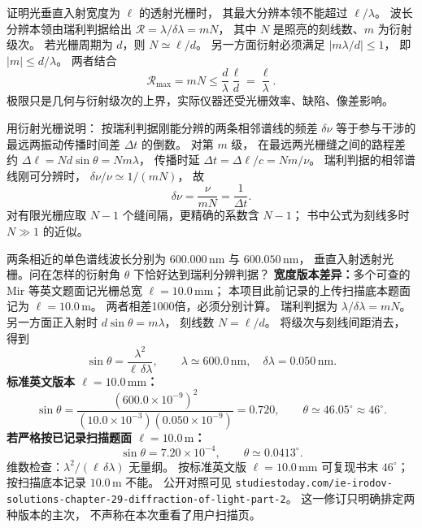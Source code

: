 证明光垂直入射宽度为 $\ell$ 的透射光栅时，
其最大分辨本领不能超过 $\ell/\lambda$。
\exsolution
波长分辨本领由瑞利判据给出
$\mathcal R=\lambda/\delta\lambda=mN$，
其中 $N$ 是照亮的刻线数、$m$ 为衍射级次。
若光栅周期为 $d$，则 $N\simeq\ell/d$。
另一方面衍射必须满足
$|m\lambda/d|\le1$，
即 $|m|\le d/\lambda$。
两者结合
\[
\boxed{\mathcal R_{\max}=mN
\le\frac d\lambda\frac\ell d
=\frac\ell\lambda}.
\]
\excheck 极限只是几何与衍射级次的上界，实际仪器还受光栅效率、缺陷、像差影响。

用衍射光栅说明：
按瑞利判据刚能分辨的两条相邻谱线的频差
$\delta\nu$ 等于参与干涉的最远两振动传播时间差 $\Delta t$ 的倒数。
\exsolution
对第 $m$ 级，
在最远两光栅缝之间的路程差约
$\Delta\ell=N d\sin\theta
=N m\lambda$，
传播时延
$\Delta t=\Delta\ell/c
=Nm/\nu$。
瑞利判据的相邻谱线刚可分辨时，
$\delta\nu/\nu\simeq1/(mN)$，
故
\[
\boxed{\delta\nu=
\frac{\nu}{mN}
=\frac1{\Delta t}}.
\]
\excheck 对有限光栅应取 $N-1$ 个缝间隔，更精确的系数含 $N-1$；
书中公式为刻线多时 $N\gg1$ 的近似。

两条相近的单色谱线波长分别为
$600.000\,\mathrm{nm}$ 与 $600.050\,\mathrm{nm}$，
垂直入射透射光栅。问在怎样的衍射角
$\theta$ 下恰好达到瑞利分辨判据？
\textbf{宽度版本差异：}多个可查的 Mir 等英文题面记光栅总宽
$\ell=10.0\,\mathrm{mm}$；
本项目此前记录的上传扫描底本题面记为
$\ell=10.0\,\mathrm m$。
两者相差1000倍，必须分别计算。
\exsolution
瑞利判据为 $\lambda/\delta\lambda=mN$。
另一方面正入射时 $d\sin\theta=m\lambda$，
刻线数 $N=\ell/d$。
将级次与刻线间距消去，得到
\[
 \boxed{\sin\theta
 =\frac{\lambda^2}{\ell\,\delta\lambda}},
 \qquad
 \lambda\simeq600.0\,\mathrm{nm},\quad
 \delta\lambda=0.050\,\mathrm{nm}.
\]
\textbf{标准英文版本 $\ell=10.0\,\mathrm{mm}$：}
\[
 \sin\theta=\frac{(600.0\times10^{-9})^2}
 {(10.0\times10^{-3})(0.050\times10^{-9})}
 =0.720,
 \qquad
 \boxed{\theta\simeq46.05^\circ\approx46^\circ}.
\]
\textbf{若严格按已记录扫描题面
$\ell=10.0\,\mathrm m$：}
\[
 \sin\theta=7.20\times10^{-4},\qquad
 \boxed{\theta\simeq0.0413^\circ}.
\]
\excheck
维数检查：$\lambda^2/(\ell\,\delta\lambda)$ 无量纲。
按标准英文版 $\ell=10.0\,\mathrm{mm}$ 可复现书末
$46^\circ$；按扫描底本记录 $10.0\,\mathrm m$ 不能。
公开对照可见
\texttt{studiestoday.com/ie-irodov-solutions-chapter-29-diffraction-of-light-part-2}。
这一修订只明确排定两种版本的主次，
不声称在本次重看了用户扫描页。

